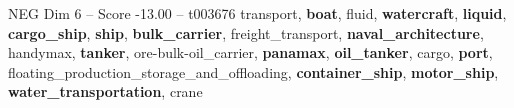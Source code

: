 \begin{textsample}{NEG Dim 6 – Score -13.00 – t003676}  \label{ex:f6_neg_001}
transport, \textbf{boat}, fluid, \textbf{watercraft}, \textbf{liquid}, \textbf{cargo\_ship}, \textbf{ship}, \textbf{bulk\_carrier}, freight\_transport, \textbf{naval\_architecture}, handymax, \textbf{tanker}, ore-bulk-oil\_carrier, \textbf{panamax}, \textbf{oil\_tanker}, cargo, \textbf{port}, floating\_production\_storage\_and\_offloading, \textbf{container\_ship}, \textbf{motor\_ship}, \textbf{water\_transportation}, crane

\end{textsample}
